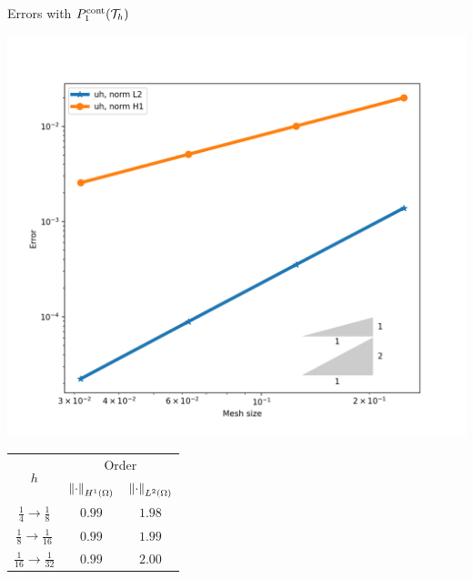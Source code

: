 \begin{frame}{Errors with $\relax{P}^{\text{cont}}_1(\mathcal{T}_h)$}
	\begin{minipage}{0.50\textwidth}
		\centering
		\includegraphics[scale=0.30]{img/Difusion/errores_difusion_P1c.png}
	\end{minipage}
	\begin{minipage}{0.49\textwidth}
		\centering
		\begin{tabular}{|c|c|c|}
			\hline 
			\multirow{2}{*}{$h$} & \multicolumn{2}{c|}{Order} \\
			\cline{2-3}
			 & $\left\|\cdot\right\|_{H^1(\Omega)}$ & $\left\|\cdot\right\|_{L^2(\Omega)}$\\ 
			\hline
			\hline
			$\frac{1}{4}\to\frac{1}{8}$ & $0.99$ & $1.98$  \\ 
			\hline 
			$\frac{1}{8}\to\frac{1}{16}$ & $0.99$ & $1.99$ \\ 
			\hline 
			$\frac{1}{16}\to\frac{1}{32}$ & $0.99$ & $2.00$ \\
			\hline
		\end{tabular}
	\end{minipage}
	\end{frame}

